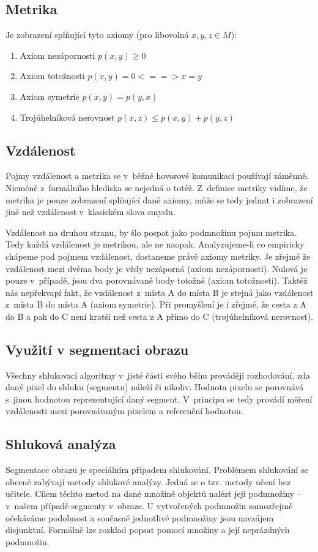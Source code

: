 \documentclass[czech, master, public, dept460, male, cpdeclaration, oneside]{diploma}
\begin{document}
\subsection{Metrika}
Je zobrazení splňující tyto axiomy (pro libovolná $x, y, z \in M$):
\begin{enumerate}
	\item Axiom nezápornosti $p(x,y) \geq 0$
	\item Axiom totožnosti $p(x, y) = 0 < == > x = y$
	\item Axiom symetrie $p (x, y) = p (y, x)$
	\item Trojúhelníková nerovnost $p(x,z)  \leq p (x,y) + p(y,z)$
\end{enumerate}

\subsection{Vzdálenost}
Pojmy vzdálenost a metrika se v běžné hovorové komunikaci používají záměnně. Nicméně z formálního hlediska se nejedná o totéž. Z definice metriky vidíme, že metrika je pouze zobrazení splňující dané axiomy, může se tedy jednat i zobrazení jiné než vzdálenost v klasickém slova smyslu.\par
Vzdálenost na druhou stranu, by šlo pospat jako podmnožinu pojmu metrika. Tedy každá vzdálenost je metrikou, ale ne naopak. Analyzujeme-li co empiricky chápeme pod pojmem vzdálenost, dostaneme právě axiomy metriky. Je zřejmé že vzdálenost mezi dvěma body je vždy nezáporná (axiom nezápornosti). Nulová je pouze v případě, jsou dva porovnávané body totožné (axiom totožnosti). Taktéž nás nepřekvapí fakt, že vzdálenost z místa A do místa B je stejná jako vzdálenost z místa B do místa A (axiom symetrie). Při promyšlení je i zřejmé, že cesta z A do B a pak do C není kratší než cesta z A přímo do C (trojúhelníková nerovnost). \cite{Shlukovani}

\subsection{Využití v segmentaci obrazu}
Všechny shlukovací algoritmy v jisté části svého běhu provádějí rozhodování, zda daný pixel do shluku (segmentu) náleží či nikoliv. Hodnota pixelu se porovnává s jinou hodnotou reprezentující daný segment. V principu se tedy provádí měření vzdálenosti mezi porovnávaným pixelem a referenční hodnotou. 

\subsection{Shluková analýza}
Segmentace obrazu je speciálním případem shlukování. Problémem shlukování se obecně zabývají metody shlukové analýzy. Jedná se o tzv. metody učení bez učitele. Cílem těchto metod na dané množině objektů nalézt její podmnožiny – v našem případě segmenty v obraze. U vytvořených podmnožin samozřejmě očekáváme podobnost a současně jednotlivé podmnožiny jsou navzájem disjunktní. Formálně lze rozklad popsat pomocí množiny  a její neprázdných podmnožin. \cite{Shlukovani}
\end{document}
